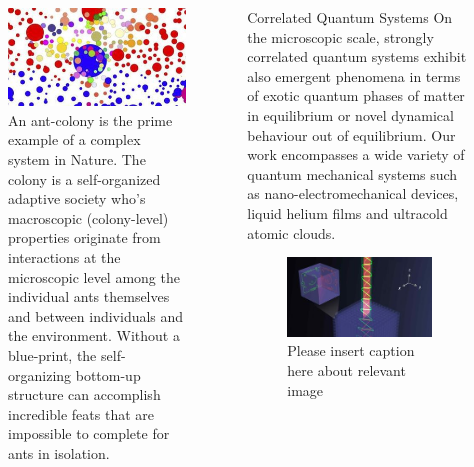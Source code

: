 \documentclass[xcolor={table}]{beamer}
\begin{document}
\begin{frame}[fragile=singleslide,t]
\begin{columns}[onlytextwidth,T]
\begin{column}{.47\textwidth}
\begin{figure}
    \centering
    \includegraphics[width=1.\columnwidth, height=0.2\textheight]{complexity.jpg}
    \caption{\footnotesize An ant-colony is the prime example of a complex system in Nature. The colony is a self-organized adaptive society who’s macroscopic (colony-level) properties originate from interactions at the microscopic level among the individual ants themselves and between individuals and the environment. Without a blue-print, the self-organizing bottom-up structure can accomplish incredible feats that are impossible to complete for ants in isolation.}
\end{figure}

\end{column}

\begin{column}{.47\textwidth}

\begin{block}{Correlated Quantum Systems}
On the microscopic scale, strongly correlated quantum systems exhibit also
emergent phenomena in terms of exotic quantum phases of matter in equilibrium or
novel dynamical behaviour out of equilibrium. Our work encompasses a wide
variety of quantum mechanical systems such as nano-electromechanical devices,
liquid helium films and ultracold atomic clouds.
\end{block}

\begin{figure}
    \includegraphics[width=1\columnwidth, height=0.2\textheight]{correlated.jpg}
    \caption{\footnotesize Please insert caption here about relevant image}
\end{figure}


\end{column}
\end{columns}
\end{frame}
\end{document}
